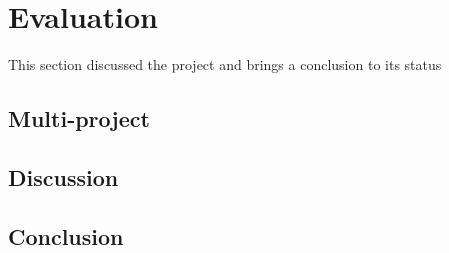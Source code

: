 \chapter{Evaluation}\label{chap:evaluation}
This section discussed the project and brings a conclusion to its status

\section{Multi-project}\label{sec:eval:multiproject}


\section{Discussion}


\section{Conclusion}
